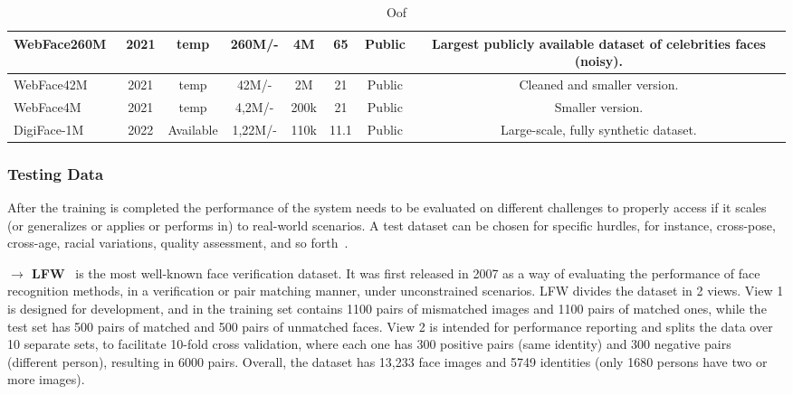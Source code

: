\documentclass[class=report, crop=false, a4paper, 12pt]{standalone}
\begin{document}
\begin{table}[!ht]
{\begin{tabular}{|l|c|c|c|c|c|c|c|}
    WebFace260M~\autocite{zhuWebFace260MBenchmarkUnveiling2021}                            & 2021          & temp                  & 260M/-                 & 4M             & 65                    & Public                & Largest publicly available dataset of celebrities faces (noisy).                 \\ \hline
    WebFace42M~\autocite{zhuWebFace260MBenchmarkUnveiling2021}                             & 2021          & temp                  & 42M/-                  & 2M             & 21                    & Public                & Cleaned and smaller version.                 \\ \hline
    WebFace4M~\autocite{zhuWebFace260MBenchmarkUnveiling2021}                              & 2021          & temp                  & 4,2M/-                 & 200k           & 21                    & Public                & Smaller version.                 \\ \hline
    DigiFace-1M~\autocite{baeDigiFace1MMillionDigital2023}                            & 2022          & Available                  & 1,22M/-                & 110k           & 11.1                  & Public                & Large-scale, fully synthetic dataset.                 \\ \hline
    \end{tabular}%
    }
    \caption{Oof}
    \label{tab:training data}
\end{table}
\newpage
\subsubsection{\large Testing Data}

\par After the training is completed the performance of the system needs to be evaluated on different challenges to properly access if it scales (or generalizes or applies or performs in) to real-world scenarios. A test dataset can be chosen for specific hurdles, for instance, cross-pose, cross-age, racial variations, quality assessment, and so forth~\autocite{duElementsEndtoendDeep2022}.


\vspace{0.7\baselineskip}
\noindent\textbf{$\rightarrow$ LFW}~\autocite{huangLabeledFacesWild} is the most well-known face verification dataset. It was first released in 2007 as a way of evaluating the performance of face recognition methods, in a verification or pair matching manner, under unconstrained scenarios. LFW divides the dataset in 2 views. View 1 is designed for development, and in the training set contains 1100 pairs of mismatched images and 1100 pairs of matched ones, while the test set has 500 pairs of matched and 500 pairs of unmatched faces. View 2 is intended for performance reporting and splits the data over 10 separate sets, to facilitate 10-fold cross validation, where each one has 300 positive pairs (same identity) and 300 negative pairs (different person), resulting in 6000 pairs. Overall, the dataset has 13,233 face images and 5749 identities (only 1680 persons have two or more images).
\end{document}
